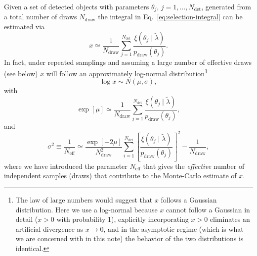 \documentclass[modern]{aastex62}
\newcommand{\Ndraw}{N_\mathrm{draw}}
\newcommand{\Ndet}{N_\mathrm{det}}
\newcommand{\Neff}{N_\mathrm{eff}}
\newcommand{\pdraw}{p_\mathrm{draw}}
\begin{document}
Given a set of detected objects with parameters $\theta_j$, $j = 1, \ldots,
\Ndet$, generated from a total number of draws $\Ndraw$ the integral in Eq.\
\eqref{eq:selection-integral} can be estimated via
%
\begin{equation}
  x \simeq \frac{1}{\Ndraw} \sum_{j=1}^{\Ndet} \frac{\xi\left( \theta_j \mid \tilde{\lambda} \right)}{\pdraw\left( \theta_j \right)}.
\end{equation}
%
In fact, under repeated samplings and assuming a large number of effective draws
(see below) $x$ will follow an approximately log-normal
distribution\footnote{The law of large numbers would suggest that $x$ follows a
Gaussian distribution.  Here we use a log-normal because $x$ cannot follow a
Gaussian in detail ($x > 0$ with probability 1), explicitly incorporating $x >
0$ eliminates an artificial divergence as $x \to 0$, and in the asymptotic
regime (which is what we are concerned with in this note) the behavior of the
two distributions is identical.}
%
\begin{equation}
    \log x \sim N\left( \mu, \sigma \right),
\end{equation}
%
with
%
\begin{equation}
  \exp\left[\mu\right] \simeq \frac{1}{\Ndraw} \sum_{j=1}^{\Ndet} \frac{\xi\left( \theta_j \mid \tilde{\lambda} \right)}{\pdraw\left( \theta_j \right)} ,
\end{equation}
%
and
%
\begin{equation}
    \sigma^2 \equiv \frac{1}{\Neff} \simeq \frac{\exp[-2\mu]}{\Ndraw^2} \sum_{i=1}^{\Ndet} \left[ \frac{\xi\left( \theta_j \mid \tilde{\lambda} \right)}{\pdraw\left( \theta_j \right)} \right]^2 - \frac{1}{\Ndraw},
\end{equation}
%
where we have introduced the parameter $\Neff$ that gives the \emph{effective}
number of independent samples (draws) that contribute to the Monte-Carlo
estimate of $x$.
\end{document}
